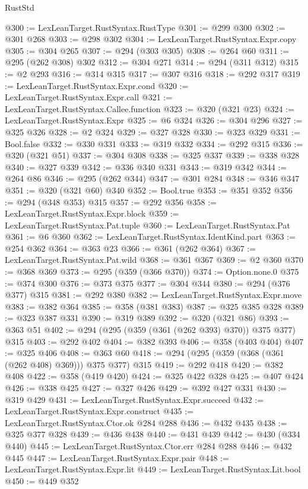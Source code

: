 \begin{lexlean}{RustStd}
\begin{coremodule}
@300 := LexLeanTarget.RustSyntax.RustType
@301 := @299 @300
@302 := @301 @268
@303 := @298 @302
@304 := LexLeanTarget.RustSyntax.Expr.copy
@305 := @304 @265
@307 := @294 (@303 @305)
@308 := @264 @60
@311 := @295 (@262 @308) @302
@312 := @304 @271
@314 := @294 (@311 @312)
@315 := @2 @293
@316 := @314 @315
@317 := @307 @316
@318 := @292 @317
@319 := LexLeanTarget.RustSyntax.Expr.cond
@320 := LexLeanTarget.RustSyntax.Expr.call
@321 := LexLeanTarget.RustSyntax.Callee.function
@323 := @320 (@321 @23)
@324 := LexLeanTarget.RustSyntax.Expr
@325 := @6 @324
@326 := @304 @296
@327 := @325 @326
@328 := @2 @324
@329 := @327 @328
@330 := @323 @329
@331 := Bool.false
@332 := @330 @331
@333 := @319 @332
@334 := @292 @315
@336 := @320 (@321 @51)
@337 := @304 @308
@338 := @325 @337
@339 := @338 @328
@340 := @327 @339
@342 := @336 @340 @331
@343 := @319 @342
@344 := @264 @86
@346 := @295 (@262 @344)
@347 := @301 @284
@348 := @346 @347
@351 := @320 (@321 @60) @340
@352 := Bool.true
@353 := @351 @352
@356 := @294 (@348 @353) @315
@357 := @292 @356
@358 := LexLeanTarget.RustSyntax.Expr.block
@359 := LexLeanTarget.RustSyntax.Pat.tuple
@360 := LexLeanTarget.RustSyntax.Pat
@361 := @6 @360
@362 := LexLeanTarget.RustSyntax.IdentKind.part
@363 := @254 @362
@364 := @363 @23
@366 := @361 (@262 @364)
@367 := LexLeanTarget.RustSyntax.Pat.wild
@368 := @361 @367
@369 := @2 @360
@370 := @368 @369
@373 := @295 (@359 (@366 @370))
@374 := Option.none.{0}
@375 := @374 @300
@376 := @373 @375
@377 := @304 @344
@380 := @294 (@376 @377) @315
@381 := @292 @380
@382 := LexLeanTarget.RustSyntax.Expr.move
@383 := @382 @364
@385 := @358 (@381 @383)
@387 := @325 @385 @328
@389 := @323 @387 @331
@390 := @319 @389
@392 := @320 (@321 @86)
@393 := @363 @51
@402 := @294 (@295 (@359 (@361 (@262 @393) @370)) @375 @377) @315
@403 := @292 @402
@404 := @382 @393
@406 := @358 (@403 @404)
@407 := @325 @406
@408 := @363 @60
@418 := @294 (@295 (@359 (@368 (@361 (@262 @408) @369))) @375 @377) @315
@419 := @292 @418
@420 := @382 @408
@422 := @358 (@419 @420)
@424 := @325 @422 @328
@425 := @407 @424
@426 := @338 @425
@427 := @327 @426
@429 := @392 @427 @331
@430 := @319 @429
@431 := LexLeanTarget.RustSyntax.Expr.succeed
@432 := LexLeanTarget.RustSyntax.Expr.construct
@435 := LexLeanTarget.RustSyntax.Ctor.ok @284 @288
@436 := @432 @435
@438 := @325 @377 @328
@439 := @436 @438
@440 := @431 @439
@442 := @430 (@334 @440)
@445 := LexLeanTarget.RustSyntax.Ctor.err @284 @288
@446 := @432 @445
@447 := LexLeanTarget.RustSyntax.Expr.pair
@448 := LexLeanTarget.RustSyntax.Expr.lit
@449 := LexLeanTarget.RustSyntax.Lit.bool
@450 := @449 @352

\end{coremodule}
\end{lexlean}
